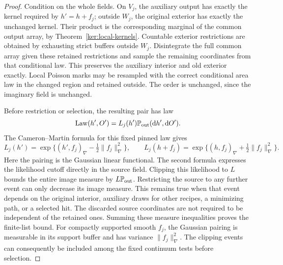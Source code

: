 \begin{proof}
Condition on the whole fields.  On \(V_j\), the auxiliary output
has exactly the kernel required by \(h'=h+f_j\); outside \(W_j\),
the original exterior has exactly the unchanged kernel.  Their
product is the corresponding marginal of the common output array,
by Theorem~\ref{ker:local-kernels}.  Countable exterior restrictions
are obtained by exhausting strict buffers outside \(W_j\).
Disintegrate the full common array given these retained restrictions
and sample the remaining coordinates from that conditional law.
This preserves the auxiliary interior and old exterior exactly.
Local Poisson marks may be resampled with the correct conditional
area law in the changed region and retained outside.  The order is
unchanged, since the imaginary field is unchanged.

Before restriction or selection, the resulting pair has law
\[
 \operatorname{Law}(h',O')=L_j(h')\mathbb P_{\rm out}(\mathrm d h',\mathrm d O').
\]
The Cameron--Martin formula for this fixed pinned law gives
\[
 L_j(h')=\exp\{(h',f_j)_\nabla-\tfrac12\|f_j\|_\nabla^2\},
 \qquad
 L_j(h+f_j)=\exp\{(h,f_j)_\nabla+\tfrac12\|f_j\|_\nabla^2\}.
\]
Here the pairing is the Gaussian linear functional. The second formula
expresses the likelihood cutoff directly in the source field. Clipping
this likelihood to \(L\) bounds the entire image measure by
\(L\mathbb P_{\rm out}\).  Restricting the source to any further event
can only decrease its image measure.  This remains true when that
event depends on the original interior, auxiliary draws for other
recipes, a minimizing path, or a selected hit.  The discarded source
coordinates are not required to be independent of the retained ones.
Summing these measure inequalities proves the finite-list bound.
For compactly supported smooth \(f_j\), the Gaussian pairing is
measurable in its support buffer and has variance
\(\|f_j\|_\nabla^2\).  The clipping events can consequently be
included among the fixed continuum tests before selection.
\end{proof}

